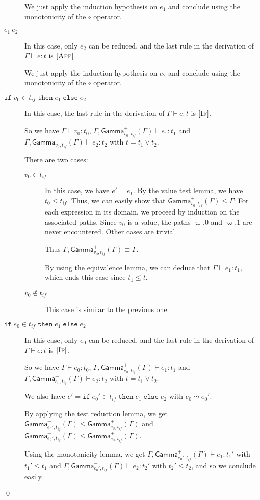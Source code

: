 \documentclass[a4paper]{article}%
\newcommand{\ite}[4]{\ensuremath{\texttt{if}\;#1\in#2\;\texttt{then}\;#3\;\texttt{else}\;#4}}
\newcommand{\Genv}[3]{\textsf{Gamma}^{#1}_{#2}(#3)}
\theoremstyle{definition}
\newcommand {\Rule}[1] {[\textsc{#1}]}
\begin{document}
\begin{description}
          We just apply the induction hypothesis on $e_1$ and conclude using the monotonicity of the $\circ$ operator.
          \item[$e_1\ e_2$] In this case, only $e_2$ can be reduced, and the last rule in the derivation of $\Gamma \vdash e:t$ is $\Rule{App}$.
    
          We just apply the induction hypothesis on $e_2$ and conclude using the monotonicity of the $\circ$ operator.
          \item[$\ite {v_0} {t_{if}} {e_1} {e_2}$] In this case, the last rule in the derivation of $\Gamma \vdash e:t$ is $\Rule{If}$.
           
          So we have $\Gamma \vdash v_0 : t_0$, $\Gamma, \Genv + {v_0,t_{if}} \Gamma\vdash e_1 : t_1$ and $\Gamma, \Genv - {v_0,t_{if}} \Gamma\vdash e_2 : t_2$ with $t=t_1\vee t_2$.
    
          There are two cases:
          \begin{description}
            \item[$v_0 \in t_{if}$] In this case, we have $e'=e_1$.
            By the value test lemma, we have $t_0 \leq t_{if}$.
            Thus, we can easily show that $\Genv + {v_0,t_{if}} \Gamma \leq \Gamma$:
            For each expression in its domain, we proceed by induction on the associated paths.
            Since $v_0$ is a value, the paths $\varpi.0$ and $\varpi.1$ are never encountered. Other cases are trivial.
    
            Thus $\Gamma, \Genv + {v_0,t_{if}} \Gamma \equiv \Gamma$.
    
            By using the equivalence lemma, we can deduce that $\Gamma \vdash e_1 : t_1$, which ends this case since $t_1 \leq t$.
            \item[$v_0 \not\in t_{if}$] This case is similar to the previous one.
          \end{description}
            
          \item[$\ite {e_0} {t_{if}} {e_1} {e_2}$] In this case, only $e_0$ can be reduced, and the last rule in the derivation of $\Gamma \vdash e:t$ is $\Rule{If}$.
          
          So we have $\Gamma \vdash e_0 : t_0$, $\Gamma, \Genv + {e_0,t_{if}} \Gamma\vdash e_1 : t_1$ and $\Gamma, \Genv - {e_0,t_{if}} \Gamma\vdash e_2 : t_2$ with $t=t_1\vee t_2$.
          
          We also have $e'=\ite {e_0'} {t_{if}} {e_1} {e_2}$ with $e_0\leadsto e_0'$.
    
          By applying the test reduction lemma, we get $\Genv + {e_0',t_{if}} \Gamma \leq \Genv + {e_0,t_{if}} \Gamma$ and
          $\Genv - {e_0',t_{if}} \Gamma \leq \Genv + {e_0,t_{if}} \Gamma$.
    
          Using the monotonicity lemma, we get $\Gamma, \Genv + {e_0',t_{if}} \Gamma\vdash e_1 : t_1'$ with $t_1'\leq t_1$
          and $\Gamma, \Genv - {e_0',t_{if}} \Gamma\vdash e_2 : t_2'$ with $t_2'\leq t_2$, and so we conclude easily.
        \end{description}
    
        \qed
\end{document}
